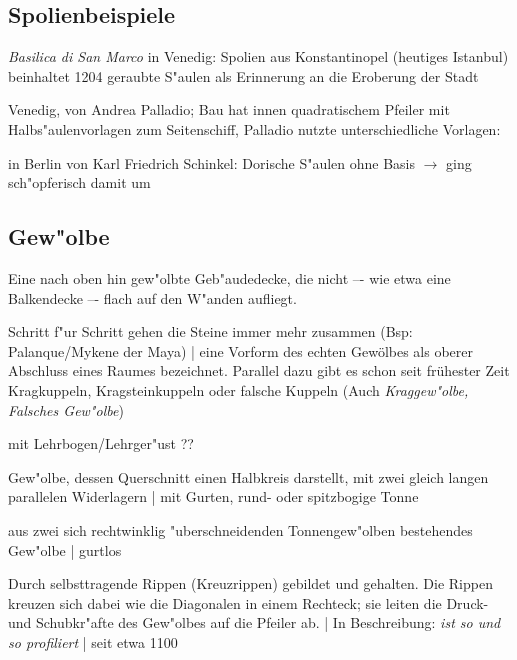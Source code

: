 \documentclass[]{scrartcl}
\begin{document}
\subsection{Spolienbeispiele}

\begin{description}[leftmargin=!,labelwidth=\widthof{\bfseries San Giorgio Maggior}]
  \item[Markusdom] \emph{Basilica di San Marco} in Venedig: Spolien aus Konstantinopel (heutiges Istanbul) beinhaltet 1204 geraubte S"aulen als Erinnerung an die Eroberung der Stadt
  \item[San Giorgio Maggiore] Venedig, von Andrea Palladio; Bau hat innen quadratischem Pfeiler mit Halbs"aulenvorlagen zum Seitenschiff, Palladio nutzte unterschiedliche Vorlagen:
  \item[Neue Wache] in Berlin von Karl Friedrich Schinkel: Dorische S"aulen ohne Basis $\rightarrow$ ging sch"opferisch damit um
\end{description}


\subsection{Gew"olbe}


\begin{description}[leftmargin=!,labelwidth=\widthof{\bfseries Kreuzgratgew"olbe1}]
  \item[Gew"olbe] Eine nach oben hin gew"olbte Geb"audedecke, die nicht –- wie etwa eine Balkendecke –- flach auf den W"anden aufliegt.
  \item[Unechtes Gew"olbe] Schritt f"ur Schritt gehen die Steine immer mehr zusammen (Bsp: Palanque/Mykene der Maya) | eine Vorform des echten Gewölbes als oberer Abschluss eines Raumes bezeichnet. Parallel dazu gibt es schon seit frühester Zeit Kragkuppeln, Kragsteinkuppeln oder falsche Kuppeln (Auch \emph{Kraggew"olbe, Falsches Gew"olbe})
  \item[W"olbung] mit Lehrbogen/Lehrger"ust ??
  \item[Tonnengew"olbe] Gew"olbe, dessen Querschnitt einen Halbkreis darstellt, mit zwei gleich langen parallelen Widerlagern | mit Gurten, rund- oder spitzbogige Tonne
  \item[Kreuzgratgew"olbe] aus zwei sich rechtwinklig "uberschneidenden Tonnengew"olben bestehendes Gew"olbe | gurtlos
  \item[Kreuzrippengew"olbe] Durch selbsttragende Rippen (Kreuzrippen) gebildet und gehalten. Die Rippen kreuzen sich dabei wie die Diagonalen in einem Rechteck; sie leiten die Druck- und Schubkr"afte des Gew"olbes auf die Pfeiler ab. | In Beschreibung: \emph{ist so und so profiliert} | seit etwa 1100 
\end{description}
\end{document}
